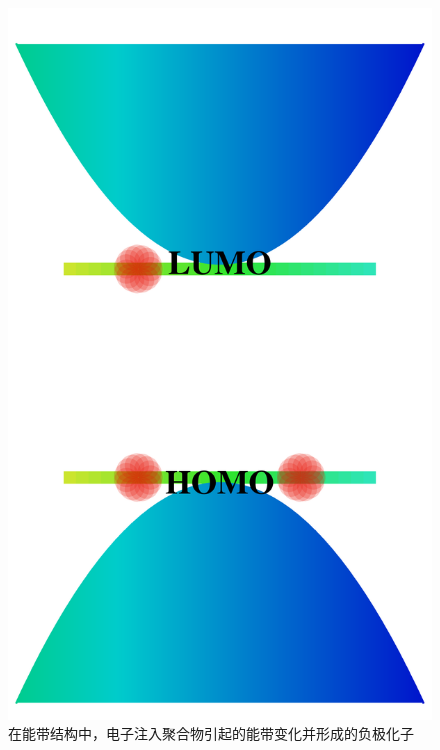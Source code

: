 \documentclass[12pt,]{report}
\begin{document}
\begin{figure}[h!]
    \centering
    \includegraphics[scale=0.09]{./figures/polaron0.png}
    \caption{在能带结构中，电子注入聚合物引起的能带变化并形成的负极化子}
\end{figure}
\end{document}
